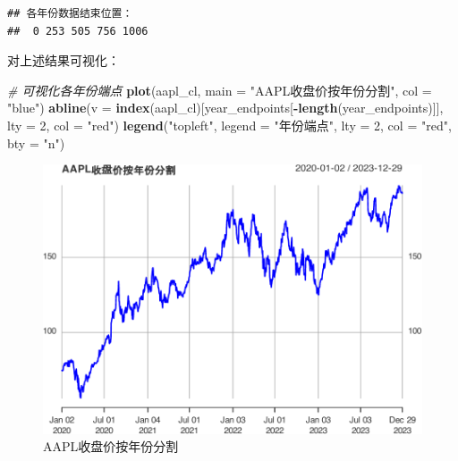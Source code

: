 \documentclass[]{ctexbook}
\newenvironment{Shaded}{\begin{snugshade}}{\end{snugshade}}
\newcommand{\AttributeTok}[1]{\textcolor[rgb]{0.13,0.29,0.53}{#1}}
\newcommand{\CommentTok}[1]{\textcolor[rgb]{0.56,0.35,0.01}{\textit{#1}}}
\newcommand{\DecValTok}[1]{\textcolor[rgb]{0.00,0.00,0.81}{#1}}
\newcommand{\FunctionTok}[1]{\textcolor[rgb]{0.13,0.29,0.53}{\textbf{#1}}}
\newcommand{\NormalTok}[1]{#1}
\newcommand{\SpecialCharTok}[1]{\textcolor[rgb]{0.81,0.36,0.00}{\textbf{#1}}}
\newcommand{\StringTok}[1]{\textcolor[rgb]{0.31,0.60,0.02}{#1}}
\begin{document}
\begin{verbatim}
## 各年份数据结束位置：
##  0 253 505 756 1006
\end{verbatim}

对上述结果可视化：

\begin{Shaded}
\begin{Highlighting}[]
\CommentTok{\# 可视化各年份端点}
\FunctionTok{plot}\NormalTok{(aapl\_cl, }\AttributeTok{main =} \StringTok{"AAPL收盘价按年份分割"}\NormalTok{, }\AttributeTok{col =} \StringTok{"blue"}\NormalTok{)}
\FunctionTok{abline}\NormalTok{(}\AttributeTok{v =} \FunctionTok{index}\NormalTok{(aapl\_cl)[year\_endpoints[}\SpecialCharTok{{-}}\FunctionTok{length}\NormalTok{(year\_endpoints)]], }
       \AttributeTok{lty =} \DecValTok{2}\NormalTok{, }\AttributeTok{col =} \StringTok{"red"}\NormalTok{)}
\FunctionTok{legend}\NormalTok{(}\StringTok{"topleft"}\NormalTok{, }\AttributeTok{legend =} \StringTok{"年份端点"}\NormalTok{, }\AttributeTok{lty =} \DecValTok{2}\NormalTok{, }\AttributeTok{col =} \StringTok{"red"}\NormalTok{, }\AttributeTok{bty =} \StringTok{"n"}\NormalTok{)}
\end{Highlighting}
\end{Shaded}

\begin{figure}
\includegraphics[width=0.9\linewidth]{quantmod_files/figure-latex/visendpoints-1} \caption{AAPL收盘价按年份分割}\label{fig:visendpoints}
\end{figure}
\end{document}
